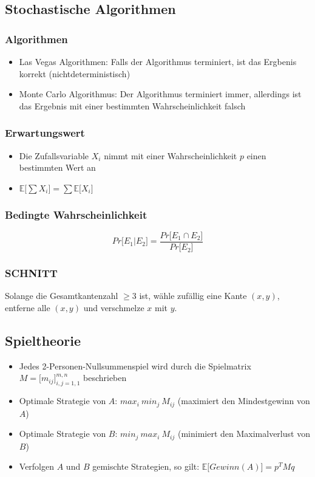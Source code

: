\subsection{Stochastische Algorithmen}

\subsubsection{Algorithmen}
\begin{itemize}
	\item Las Vegas Algorithmen: Falls der Algorithmus terminiert, ist das Ergbenis korrekt (nichtdeterministisch)
	\item Monte Carlo Algorithmus: Der Algorithmus terminiert immer, allerdings ist das Ergebnis mit einer bestimmten Wahrscheinlichkeit falsch
\end{itemize}

\subsubsection{Erwartungswert}
\begin{itemize}
	\item Die Zufallsvariable \(X_i\) nimmt mit einer Wahrscheinlichkeit \(p\) einen bestimmten Wert an
	\item \(\mathbb{E}\lbrack \sum X_i \rbrack = \sum \mathbb{E} \lbrack X_i \rbrack\)
\end{itemize}

\subsubsection{Bedingte Wahrscheinlichkeit}
\[Pr\lbrack E_1 | E_2 \rbrack = \frac{Pr \lbrack E_1 \cap E_2 \rbrack}{Pr \lbrack E_2 \rbrack}\]

\subsubsection{SCHNITT}
Solange die Gesamtkantenzahl \(\geq 3\) ist, wähle zufällig eine Kante \((x,y)\), entferne alle \((x,y)\) und verschmelze \(x\) mit \(y\).


\subsection{Spieltheorie}
\begin{itemize}
	\item Jedes 2-Personen-Nullsummenspiel wird durch die Spielmatrix \(M = \lbrack m_{ij} \rbrack_{i,j=1,1}^{m,n}\) beschrieben
	\item Optimale Strategie von \(A\): \(max_i~min_j~M_{ij}\) (maximiert den Mindestgewinn von \(A\))
	\item Optimale Strategie von \(B\): \(min_j~max_i~M_{ij}\) (minimiert den Maximalverlust von \(B\))
	\item Verfolgen \(A\) und \(B\) gemischte Strategien, so gilt: \(\mathbb{E} \lbrack Gewinn(A)\rbrack = p^TMq\)
\end{itemize}

